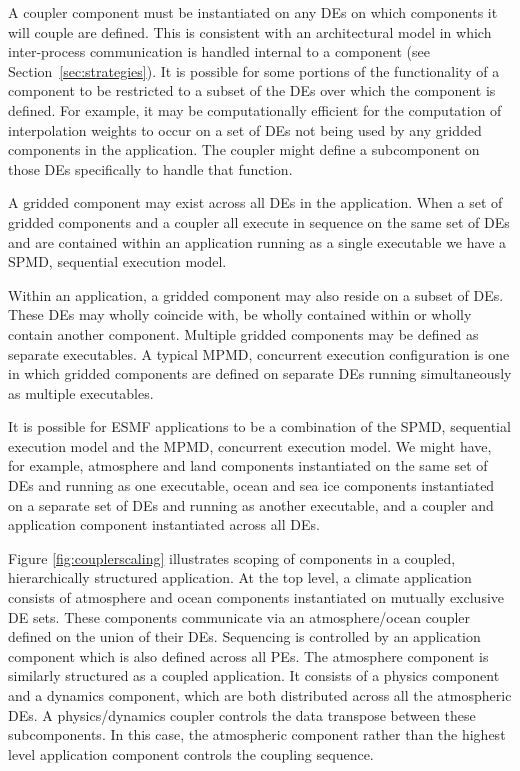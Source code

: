 A coupler component must be instantiated on any DEs on which components
it will couple are defined.  This is consistent with an architectural
model in which inter-process communication is handled internal to 
a component (see Section~\ref{sec:strategies}).  It is possible for
some portions of the functionality of a component to be restricted to
a subset of the DEs over which the component is defined.  For example, 
it may be computationally efficient for the computation of interpolation
weights to occur on a set of DEs not being used by any gridded components
in the application.  The coupler might define a subcomponent on those DEs 
specifically to handle that function.

A gridded component may exist across all DEs in the application.  When 
a set of gridded  components and a coupler all execute in sequence on 
the same set of DEs and are contained within an application running 
as a single executable we have a SPMD, sequential execution model.  

Within an application, a gridded component may also reside on 
a subset of DEs.  These DEs may wholly coincide with, be wholly 
contained within or wholly contain another component.  Multiple gridded 
components may be defined as separate executables.  A typical 
MPMD, concurrent execution configuration is one in which gridded components 
are defined on separate DEs running simultaneously as multiple 
executables.  

It is possible for ESMF applications to be a combination of the SPMD, 
sequential 
execution model and the MPMD, concurrent execution model.  We might have,
for example, atmosphere and land components instantiated on the same set of 
DEs and running as one executable, ocean and sea ice 
components instantiated on a separate set of DEs and running as 
another executable, and a coupler and application component 
instantiated across all DEs.

Figure \ref{fig:couplerscaling} illustrates scoping of components
in a coupled, hierarchically structured application.  At the top level, 
a climate application consists of atmosphere and ocean components 
instantiated on mutually exclusive DE sets.  These components communicate 
via an atmosphere/ocean coupler defined on the union of their DEs.  
Sequencing is controlled by an application
component which is also defined across all PEs.  The atmosphere component
is similarly structured as a coupled application.  It consists of a 
physics component and a dynamics component, which are both distributed
across all the atmospheric DEs.  A physics/dynamics coupler controls
the data transpose between these subcomponents.  In this case, the
atmospheric component rather than the highest level application component
controls the coupling sequence.  

